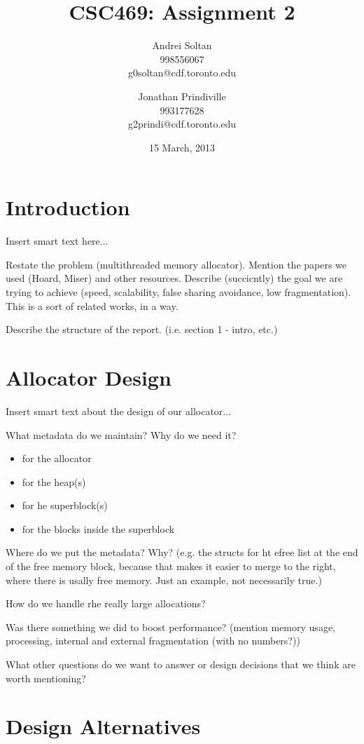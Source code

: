 \documentclass{article}
\author{Andrei Soltan\\998556067\\g0soltan@cdf.toronto.edu
\and Jonathan Prindiville\\993177628\\g2prindi@cdf.toronto.edu}
\title{CSC469: Assignment 2}
\date{15 March, 2013}
\begin{document}
\maketitle

\tableofcontents

\newpage
\section{Introduction}

Insert smart text here...

Restate the problem (multithreaded memory allocator). Mention the papers we
used (Hoard, Miser) and other resources. Describe (succicntly) the goal we are 
trying to achieve (speed, scalability, false sharing avoidance, low fragmentation). 
This is a sort of related works, in a way.

Describe the structure of the report. (i.e. section 1 - intro, etc.)

\newpage
\section{Allocator Design}

Insert smart text about the design of our allocator...

What metadata do we maintain? Why do we need it?
\begin{itemize}
	\item for the allocator
	\item for the heap(s)
	\item for he superblock(s)
	\item for the blocks inside the superblock
\end{itemize}

Where do we put the metadata? Why? (e.g. the structs for ht efree list at the 
end of the free memory block, because that makes it easier to merge to the 
right, where there is usally free memory. Just an example, not necessarily true.)

How do we handle rhe really large allocations?

Was there something we did to boost performance? (mention memory usage, 
processing, internal and external fragmentation (with no numbers?))

What other questions do we want to answer or design decisions that we think
are worth mentioning?

\newpage
\section{Design Alternatives}
\end{document}
